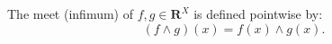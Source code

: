 The meet (infimum) of $f, g \in \mathbf{R}^X$ is defined pointwise by:
$$(f \wedge g)(x) = f(x) \wedge g(x).$$
